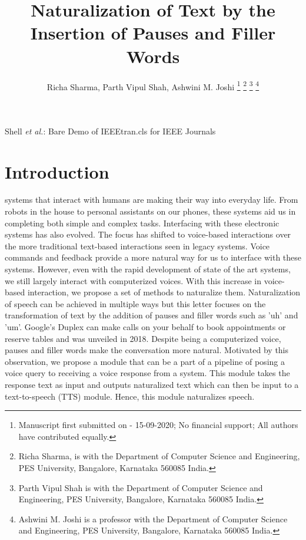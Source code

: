 \documentclass[journal]{IEEEtran}
\begin{document}
\title{Naturalization of Text by the Insertion of Pauses and Filler Words}

\author{Richa Sharma, Parth Vipul Shah, Ashwini M. Joshi 
\thanks{Manuscript first submitted on - 15-09-2020; No financial support; All authors have contributed equally.}
\thanks{Richa Sharma, is with the Department of Computer Science and Engineering, PES University, Bangalore, Karnataka 560085 India.}
\thanks{Parth Vipul Shah is with the Department of Computer Science and Engineering, PES University, Bangalore, Karnataka 560085 India.}
\thanks{Ashwini M. Joshi is a professor with the Department of Computer Science and Engineering, PES University, Bangalore, Karnataka 560085 India.}
}

{Shell \MakeLowercase{\textit{et al.}}: Bare Demo of IEEEtran.cls for IEEE Journals}
\maketitle

\begin{abstract}

\end{abstract}

\begin{IEEEkeywords}

\end{IEEEkeywords}

\IEEEpeerreviewmaketitle

\section{Introduction}

 systems that interact with humans are making their way into everyday life. From robots in the house to personal assistants on our phones, these systems aid us in completing both simple and complex tasks. Interfacing with these electronic systems has also evolved. The focus has shifted to voice-based interactions over the more traditional text-based interactions seen in legacy systems. Voice commands and feedback provide a more natural way for us to interface with these systems. However, even with the rapid development of state of the art systems, we still largely interact with computerized voices. With this increase in voice-based interaction, we propose a set of methods to naturalize them. Naturalization of speech can be achieved in multiple ways but this letter focuses on the transformation of text by the addition of pauses and filler words such as 'uh' and 'um'. Google's Duplex can make calls on your behalf to book appointments or reserve tables and was unveiled in 2018. Despite being a computerized voice, pauses and filler words make the conversation more natural. Motivated by this observation, we propose a module that can be a part of a pipeline of posing a voice query to receiving a voice response from a system. This module takes the response text as input and outputs naturalized text which can then be input to a text-to-speech (TTS) module. Hence, this module naturalizes speech. \\
\end{document}
